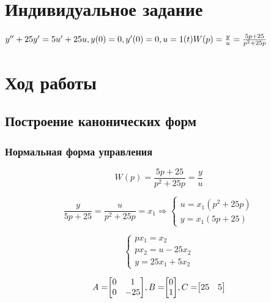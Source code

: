 \documentclass[14pt,a4paper,report]{report}
\begin{document}
\section{Индивидуальное задание}

$
\\
y''+25y'=5u'+25u, y(0)=0, y'(0)=0, u=1(t)\\\\
W(p)=\frac{y}{u}=\frac{5p+25}{p^2+25p}
$

\section{Ход работы}

\subsection{Построение канонических форм}

\subsubsection{Нормальная форма управления}

\begin{equation*}
\text{$W(p)=\frac{5p+25}{p^2+25p}=\frac{y}{u}$}
\end{equation*}

\begin{equation*}
\text{$\frac{y}{5p+25}=\frac{u}{p^2+25p}=x_1$}
\Longrightarrow
\begin{cases}
	\text{$u=x_1(p^2+25p)$} \\
	\text{$y=x_1(5p+25)$}
\end{cases}
\end{equation*}

\begin{equation*}
\begin{cases}
	\text{$px_1=x_2$} \\
	\text{$px_2=u-25x_2$}\\
	\text{$y=25x_1+5x_2$}
\end{cases}
\end{equation*}

\begin{equation*}
\text{$A=$}
\text{$
\begin{bmatrix}
0 & 1 \\
0 & -25 \\
\end{bmatrix}
$}
\text{$, B=$}
\text{$
\begin{bmatrix}
0 \\
1 \\
\end{bmatrix}
$}
\text{$, C=$}
\text{$
\begin{bmatrix}
25 & 5 \\
\end{bmatrix}
$}
\end{equation*}
\end{document}

